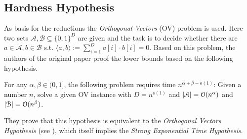 \subsection{Hardness Hypothesis}
As basis for the reductions the \emph{Orthogonal Vectors} (OV) problem is used.
Here two sets $\mathcal{A}, \mathcal{B} \subseteq \{0,1\}^D$ are given and the task is to decide whether there are $a \in \mathcal{A}, b \in \mathcal{B}$ s.t. $\langle a,b \rangle := \sum_{i=1}^D a[i]\cdot b[i] = 0$.
Based on this problem, the authors of the original paper proof the lower bounds based on the following hypothesis.
%
\begin{definition}
For any $\alpha, \beta \in (0,1]$, the following problem requires time $n^{\alpha + \beta - o(1)}$:
Given a number $n$, solve a given OV instance with 
$D = n^{o(1)}$ and $|\mathcal{A}| = \mathcal{O}(n^\alpha)$ and $|\mathcal{B}| = \mathcal{O}(n^\beta)$.
\end{definition}
%
They prove that this hypothesis is equivalent to the \emph{Orthogonal Vectors Hypothesis} (see \cite[Lemma 5.1]{Bringman.2018}), which itself implies the \emph{Strong Exponential Time Hypothesis}.


%
%


